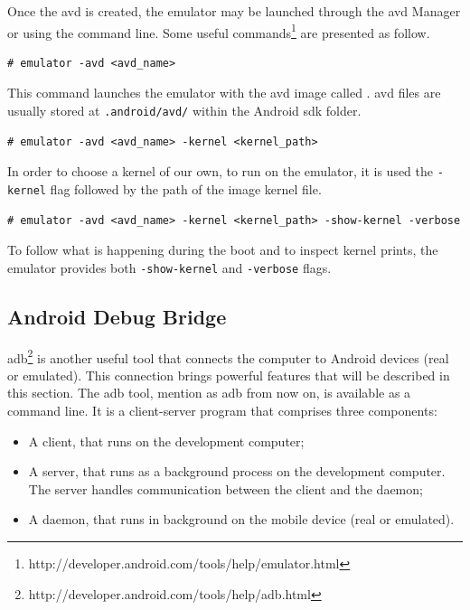 Once the \gls{avd} is created, the emulator may be launched through the \gls{avd} Manager or using the command line. Some useful commands\footnote{http://developer.android.com/tools/help/emulator.html} are presented as follow.

\begin{lstlisting}[caption=Command to start the Android emulator]
# emulator -avd <avd_name>
\end{lstlisting}

This command launches the emulator with the \gls{avd} image called . \gls{avd} files are usually stored at \texttt{.android/avd/} within the Android \gls{sdk} folder.

\begin{lstlisting}[caption=Command to provide a kernel to the Android emulator]
# emulator -avd <avd_name> -kernel <kernel_path>
\end{lstlisting}

In order to choose a kernel of our own, to run on the emulator, it is used the \texttt{-kernel} flag followed by the path of the image kernel file.

 \begin{lstlisting}[caption=Command to provide kernel prints of the Android emulator]
# emulator -avd <avd_name> -kernel <kernel_path> -show-kernel -verbose
\end{lstlisting}

To follow what is happening during the boot and to inspect kernel prints, the emulator provides both \texttt{-show-kernel} and \texttt{-verbose} flags.

\subsection{Android Debug Bridge}

\gls{adb}\footnote{http://developer.android.com/tools/help/adb.html} is another useful tool that connects the computer to Android devices (real or emulated). This connection brings powerful features that will be described in this section. The \gls{adb} tool, mention as adb from now on, is available as a command line. It is a client-server program that comprises three components:

\begin{itemize}
\item A client, that runs on the development computer;
\item A server, that runs as a background process on the development computer. The server handles communication between the client and the daemon;
\item A daemon, that runs in background on the mobile device (real or emulated).
\end{itemize}

